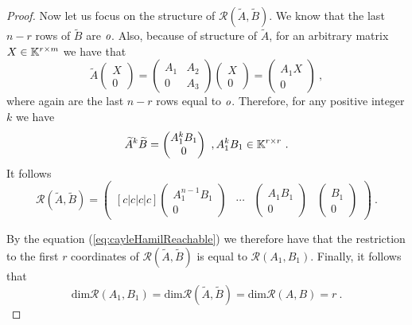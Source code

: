 \begin{proof}
	Now let us focus on the structure of $\mathcal{R}(\widetilde{A},\widetilde{B})$. We know that the last $n-r$ rows of $\widetilde{B}$ are $\textit{o}$. Also, because of structure of $\widetilde{A}$, for an arbitrary matrix $X\in\mathbb{K}^{r\times m}$ we have that 
	\begin{equation*}
		\widetilde{A}
		\begin{pmatrix}
			X \\
			0
		\end{pmatrix}
		=
		\begin{pmatrix}
			A_1 & A_2 \\
			  0 & A_3
		\end{pmatrix}
		\begin{pmatrix}
			X \\
			0
		\end{pmatrix}
		=
		\begin{pmatrix}
			A_1X \\
			0
		\end{pmatrix}\ ,
	\end{equation*}
	where again are the last $n-r$ rows equal to $\textit{o}$. Therefore, for any positive integer $k$ we have 
	\begin{equation*}
		\widetilde{A}^k\widetilde{B}=
		\begin{pmatrix}
			A_1^{k}B_1 \\
			0
        \end{pmatrix}
        \ ,A_1^kB_1\in\mathbb{K}^{r\times r}\ .
    \end{equation*}
    It follows
    \begin{equation*}
        \mathcal{R}(\widetilde{A},\widetilde{B})=
        \begin{pmatrix}[c|c|c|c]
            \begin{pmatrix}
                A_1^{n-1}B_1 \\
                0 
            \end{pmatrix}
            & \cdots &
            \begin{pmatrix}
                A_1B_1 \\
                0 
            \end{pmatrix}
            &
            \begin{pmatrix}
                B_1 \\
                0 
            \end{pmatrix}
        \end{pmatrix}\ .
    \end{equation*}
	
	By the equation (\ref{eq:cayleHamilReachable}) we therefore have that the restriction to the first $r$ coordinates of $\mathcal{R}(\widetilde{A},\widetilde{B})$ is equal to $\mathcal{R}(A_1,B_1)$. Finally, it follows that
	$$\text{dim}\mathcal{R}(A_1,B_1)=\text{dim}\mathcal{R}(\widetilde{A},\widetilde{B})=\text{dim}\mathcal{R}(A,B)=r\ .$$
\end{proof}

